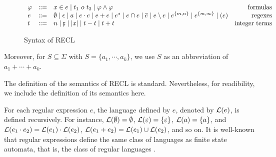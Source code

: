 \begin{figure}[h]
  \centering
$ \begin{array}{l l l r}
    \varphi & ::= & x\in e \mid t_1\  o\ t_2 \mid  \varphi \wedge \varphi                                              & \mbox{formulas}            \\
    e &::= & \emptyset \mid \epsilon \mid a \mid e\cdot e \mid e+e \mid e^* \mid e \cap e \mid \overline{e} \mid e \setminus e \mid e^{\{m,n\}} \mid e^{\{m,\infty\}} \mid (e) & \mbox{regexes} \\
    t &::= & n \mid \mathfrak{x} \mid  |x| \mid t - t \mid t + t                                                                    & \mbox{integer terms}
    \end{array}
  $
  \caption{Syntax of RECL }\label{fig:syntax}
\end{figure}
Moreover, for $S \subseteq \Sigma$ with $S = \{a_1, \cdots, a_k\}$, we use $S$ as an abbreviation of $a_1 + \cdots + a_k$.

The definition of the semantics of RECL is standard. Nevertheless, for readibility, we include the definition of its semantics here. 

For each regular expression $e$, the language defined by $e$, denoted by $\mathcal{L}(e)$, is defined recursively. For instance, $\mathcal{L}(\emptyset) = \emptyset$, $\mathcal{L}(\varepsilon) = \{\varepsilon\}$, $\mathcal{L}(a) = \{a\}$, and $\mathcal{L}(e_1 \cdot e_2) = \mathcal{L}(e_1) \cdot \mathcal{L}(e_2)$, $\mathcal{L}(e_1 + e_2) = \mathcal{L}(e_1) \cup \mathcal{L}(e_2)$, and so on. 
It is well-known that regular expressions define the same class of languages as finite state automata, that is, the class of regular languages \cite{HU79}. 

